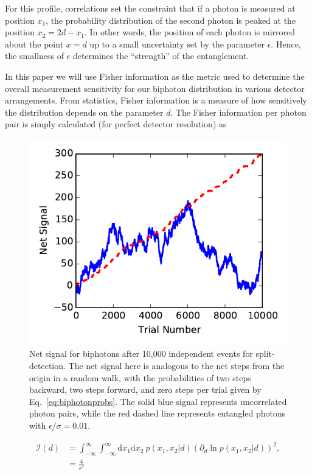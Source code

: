For this profile, correlations set the constraint that if a photon is measured at position $x_1$, the probability distribution of the second photon is peaked at the position $x_2 = 2d - x_1$.  
In other words, the position of each photon is mirrored about the point $x = d$ up to a small uncertainty set by the parameter $\epsilon$. 
Hence, the smallness of $\epsilon$ determines the ``strength'' of the entanglement. 

In this paper we will use Fisher information \cite{Larsen2001} as the metric used to determine the overall measurement sensitivity for our biphoton distribution in various detector arrangements.  
From statistics, Fisher information is a measure of how sensitively the distribution depends on the parameter $d$.
The Fisher information per photon pair is simply calculated (for perfect detector resolution) as 
\begin{figure}
	\centerline{\includegraphics[scale=1]{Biphotons/Figures/random-walk.pdf}}
	\caption{Net signal for biphotons after 10,000 independent events for split-detection.  
		The net signal here is analogous to the net steps from the origin in a random walk, with the probabilities of two steps backward, two steps forward, and zero steps per trial given by Eq.~\eqref{eq:biphotonprobs}.  
		The solid blue signal represents uncorrelated photon pairs, while the red dashed line represents entangled photons with $\epsilon/\sigma = 0.01$.}
	\label{fig:random walk}
\end{figure}
\begin{align}\label{eq:biphotonFisher}
	\nonumber	\mathcal{I}(d) &= \int^\infty_{-\infty}\int^\infty_{-\infty} \text{d}x_1 \text{d}x_2~ p({x_1,x_2}|d)\left( \partial_d \ln  p({x_1,x_2}|d)\right)^2, \\
	&= \frac{4}{\epsilon^2}
\end{align}
